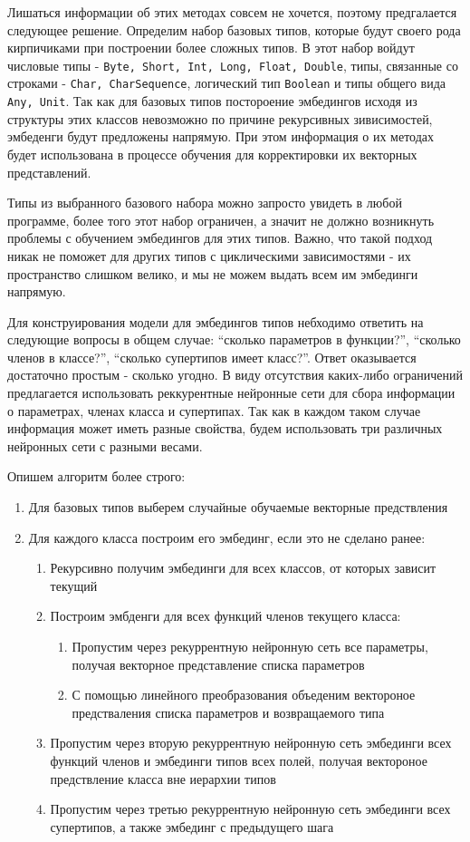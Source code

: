 \documentclass[times,specification,annotation]{itmo-student-thesis}
\begin{document}
Лишаться информации об этих методах совсем не хочется, поэтому предгалается следующее решение. Определим набор базовых типов, которые будут своего рода кирпичиками при построении более сложных типов. В этот набор войдут числовые типы - \texttt{Byte, Short, Int, Long, Float, Double}, типы, связанные со строками - \texttt{Char, CharSequence}, логический тип \texttt{Boolean} и типы общего вида \texttt{Any, Unit}. Так как для базовых типов постороение эмбедингов исходя из структуры этих классов невозможно по причине рекурсивных зивисимостей, эмбеденги будут предложены напрямую. При этом информация о их методах будет использована в процессе обучения для корректировки их векторных представлений.

Типы из выбранного базового набора можно запросто увидеть в любой программе, более того этот набор ограничен, а значит не должно возникнуть проблемы с обучением эмбедингов для этих типов. Важно, что такой подход никак не поможет для других типов с циклическими зависимостями - их пространство слишком велико, и мы не можем выдать всем им эмбединги напрямую.

Для конструирования модели для эмбедингов типов небходимо ответить на следующие вопросы в общем случае: ``сколько параметров в функции?'', ``сколько членов в классе?'', ``сколько супертипов имеет класс?''. Ответ оказывается достаточно простым - сколько угодно. В виду отсутствия каких-либо ограничений предлагается использовать реккурентные нейронные сети для сбора информации о параметрах, членах класса и супертипах. Так как в каждом таком случае информация может иметь разные свойства, будем использовать три различных нейронных сети с разными весами.

Опишем алгоритм более строго:
\begin{enumerate}
    \item Для базовых типов выберем случайные обучаемые векторные предствления
    \item Для каждого класса построим его эмбединг, если это не сделано ранее:
    \begin{enumerate}
        \item Рекурсивно получим эмбединги для всех классов, от которых зависит текущий
        \item Построим эмбденги для всех функций членов текущего класса:
        \begin{enumerate}
            \item Пропустим через рекуррентную нейронную сеть все параметры, получая векторное представление списка параметров
            \item С помощью линейного преобразования объеденим вектороное предстваления списка параметров и возвращаемого типа
        \end{enumerate}
        \item Пропустим через вторую рекуррентную нейронную сеть эмбединги всех функций членов и эмбединги типов всех полей, получая вектороное предствление класса вне иерархии типов
        \item Пропустим через третью рекуррентную нейронную сеть эмбединги всех супертипов, а также эмбединг с предыдущего шага
    \end{enumerate}
\end{enumerate}
\end{document}
